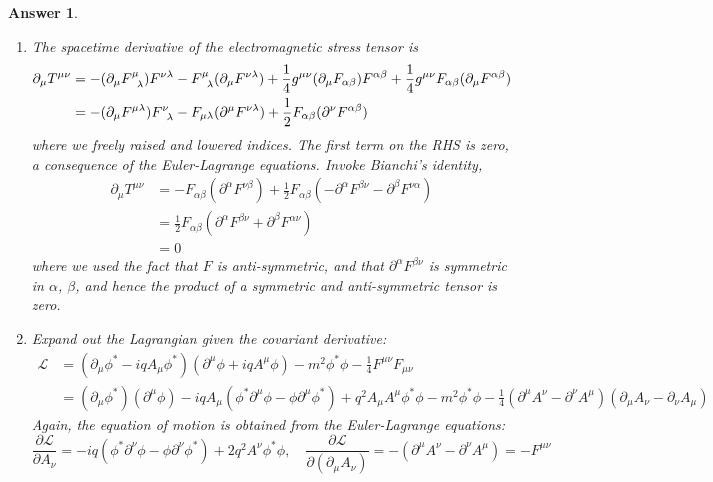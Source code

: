 \documentclass[a4paper]{article}
\newtheorem{ans}{Answer}[section]
\theoremstyle{new}
\begin{document}
\begin{ans}
\begin{enumerate}[label=(\alph*)]
$$\boldsymbol{\nabla}\cdot\mathbf{E}=0,\quad\boldsymbol{\nabla}\times\mathbf{B}=\varepsilon_0\mu_0\frac{\partial\mathbf{E}}{\partial t}$$
\item The spacetime derivative of the electromagnetic stress tensor is
\begin{align}
    \partial_\mu T^{\mu\nu}&=-(\partial_\mu\tensor*{F}{*_{}^{\mu}_{\lambda}})F^{\nu\lambda}-\tensor*{F}{*_{}^{\mu}_{\lambda}}(\partial_\mu F^{\nu\lambda})+\frac{1}{4}g^{\mu\nu}(\partial_\mu F_{\alpha\beta})F^{\alpha\beta}+\frac{1}{4}g^{\mu\nu}F_{\alpha\beta}(\partial_\mu F^{\alpha\beta})\nonumber\\&=-(\partial_\mu F^{\mu\lambda})\tensor*{F}{*_{}^{\nu}_{\lambda}}-F_{\mu\lambda}(\partial^\mu F^{\nu\lambda})+\frac{1}{2}F_{\alpha\beta}(\partial^\nu F^{\alpha\beta})\nonumber
\end{align}
where we freely raised and lowered indices. The first term on the RHS is zero, a consequence of the Euler-Lagrange equations. Invoke Bianchi's identity,
\begin{align}
    \partial_\mu T^{\mu\nu}&=-F_{\alpha\beta}(\partial^\alpha F^{\nu\beta})+\frac{1}{2}F_{\alpha\beta}(-\partial^\alpha F^{\beta\nu}-\partial^\beta F^{\nu\alpha})\nonumber\\&=\frac{1}{2}F_{\alpha\beta}(\partial^\alpha F^{\beta\nu}+\partial^\beta F^{\alpha\nu})\nonumber\\&=0\nonumber
\end{align}
where we used the fact that $F$ is anti-symmetric, and that $\partial^\alpha F^{\beta\nu}$ is symmetric in $\alpha$, $\beta$, and hence the product of a symmetric and anti-symmetric tensor is zero.
\item Expand out the Lagrangian given the covariant derivative:
\begin{align}
    \mathcal{L}&=(\partial_\mu\phi^*-iqA_\mu\phi^*)(\partial^\mu\phi+iqA^\mu\phi)-m^2\phi^*\phi-\frac{1}{4}F^{\mu\nu}F_{\mu\nu}\nonumber\\&=(\partial_\mu\phi^*)(\partial^\mu\phi)-iqA_\mu(\phi^*\partial^\mu\phi-\phi\partial^\mu\phi^*)+q^2A_\mu A^\mu\phi^*\phi-m^2\phi^*\phi-\frac{1}{4}(\partial^\mu A^\nu-\partial^\nu A^\mu)(\partial_\mu A_\nu-\partial_\nu A_\mu)\nonumber
\end{align}
Again, the equation of motion is obtained from the Euler-Lagrange equations:
$$\frac{\partial\mathcal{L}}{\partial A_\nu}=-iq(\phi^*\partial^\nu\phi-\phi\partial^\nu\phi^*)+2q^2A^\nu\phi^*\phi,\quad\frac{\partial\mathcal{L}}{\partial(\partial_\mu A_\nu)}=-(\partial^\mu A^\nu-\partial^\nu A^\mu)=-F^{\mu\nu}$$

\end{enumerate}
\end{ans}
\end{document}
